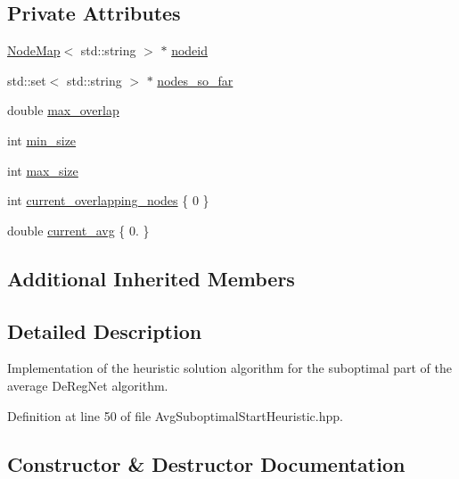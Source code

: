 \subsection*{Private Attributes}
\begin{DoxyCompactItemize}
\item 
\hyperlink{namespacederegnet_ae102b707ae1d6f83c639ece5e0dd5658}{Node\+Map}$<$ std\+::string $>$ $\ast$ \hyperlink{classderegnet_1_1AvgSuboptimalStartHeuristic_af59e6b6ba10fd5d2c210a0947cf37e66}{nodeid}
\item 
std\+::set$<$ std\+::string $>$ $\ast$ \hyperlink{classderegnet_1_1AvgSuboptimalStartHeuristic_ac07c2b61bf03b25e1bd87cb353bd4597}{nodes\+\_\+so\+\_\+far}
\item 
double \hyperlink{classderegnet_1_1AvgSuboptimalStartHeuristic_a6e019ada1557663d456e7f81757d14ab}{max\+\_\+overlap}
\item 
int \hyperlink{classderegnet_1_1AvgSuboptimalStartHeuristic_a71b5a73f79c4c161e9df9085ece2c270}{min\+\_\+size}
\item 
int \hyperlink{classderegnet_1_1AvgSuboptimalStartHeuristic_aafc01553c8d2a9a877f23c6bdee305aa}{max\+\_\+size}
\item 
int \hyperlink{classderegnet_1_1AvgSuboptimalStartHeuristic_ad541b941d327ba928a7951e43ad1fea4}{current\+\_\+overlapping\+\_\+nodes} \{ 0 \}
\item 
double \hyperlink{classderegnet_1_1AvgSuboptimalStartHeuristic_a5c07fde8d2f92daeb4cc33f85e8bf1e2}{current\+\_\+avg} \{ 0. \}
\end{DoxyCompactItemize}
\subsection*{Additional Inherited Members}


\subsection{Detailed Description}
Implementation of the heuristic solution algorithm for the suboptimal part of the average De\+Reg\+Net algorithm. 

Definition at line 50 of file Avg\+Suboptimal\+Start\+Heuristic.\+hpp.



\subsection{Constructor \& Destructor Documentation}
\mbox{\label{classderegnet_1_1AvgSuboptimalStartHeuristic_a12082995005a50591bb64951417b2a96}} 
